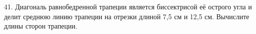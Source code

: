 41. Диагональ равнобедренной трапеции является биссектрисой её острого угла и делит среднюю линию трапеции на отрезки длиной 7,5 см и 12,5 см. Вычислите длины сторон трапеции.\\
